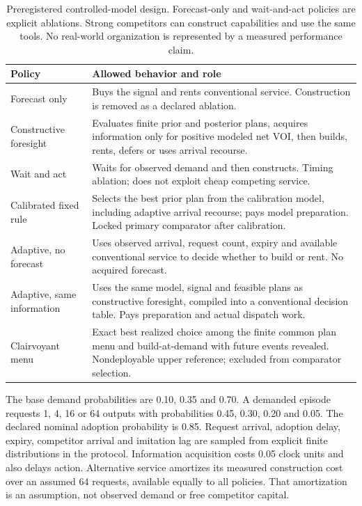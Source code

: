\begin{table}[ht]\centering\small
\begin{tabularx}{\linewidth}{@{}L{35mm}Y@{}}\toprule
Policy & Allowed behavior and role \\\midrule
Forecast only & Buys the signal and rents conventional service. Construction is removed as a declared ablation. \\
Constructive foresight & Evaluates finite prior and posterior plans, acquires information only for positive modeled net VOI, then builds, rents, defers or uses arrival recourse. \\
Wait and act & Waits for observed demand and then constructs. Timing ablation; does not exploit cheap competing service. \\
Calibrated fixed rule & Selects the best prior plan from the calibration model, including adaptive arrival recourse; pays model preparation. Locked primary comparator after calibration. \\
Adaptive, no forecast & Uses observed arrival, request count, expiry and available conventional service to decide whether to build or rent. No acquired forecast. \\
Adaptive, same information & Uses the same model, signal and feasible plans as constructive foresight, compiled into a conventional decision table. Pays preparation and actual dispatch work. \\
Clairvoyant menu & Exact best realized choice among the finite common plan menu and build-at-demand with future events revealed. Nondeployable upper reference; excluded from comparator selection. \\\bottomrule
\end{tabularx}
\caption{Preregistered controlled-model design. Forecast-only and wait-and-act policies are explicit ablations. Strong competitors can construct capabilities and use the same tools. No real-world organization is represented by a measured performance claim.}
\label{tab:policies}\end{table}

The base demand probabilities are 0.10, 0.35 and 0.70. A demanded episode requests 1, 4, 16 or 64 outputs with probabilities 0.45, 0.30, 0.20 and 0.05. The declared nominal adoption probability is 0.85. Request arrival, adoption delay, expiry, competitor arrival and imitation lag are sampled from explicit finite distributions in the protocol. Information acquisition costs 0.05 clock units and also delays action. Alternative service amortizes its measured construction cost over an assumed 64 requests, available equally to all policies. That amortization is an assumption, not observed demand or free competitor capital.

